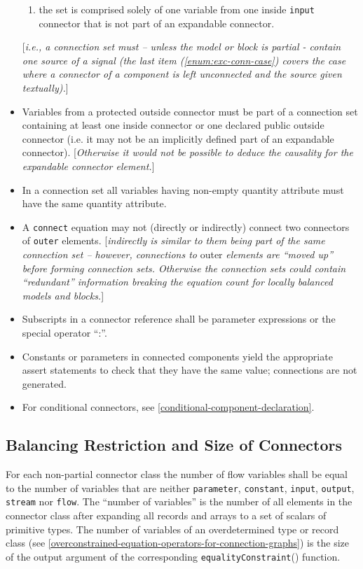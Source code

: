 \begin{itemize}
\begin{enumerate}
\item the  set is comprised solely of one variable from one inside \lstinline!input!
  connector that is not part of an expandable connector. \label{enum:exc-conn-case}
\end{enumerate}
{[}\emph{i.e., a connection set must -- unless the model or block is partial -
  contain one source of a signal (the last item (\autoref{enum:exc-conn-case}) covers the case
  where a connector of a component is left unconnected and the source
  given textually).}{]}
\item
  Variables from a protected outside connector must be part of a
  connection set containing at least one inside connector or one
  declared public outside connector (i.e. it may not be an implicitly
  defined part of an expandable connector). {[}\emph{Otherwise it would
  not be possible to deduce the causality for the expandable connector
  element.}{]}
\item
  In a connection set all variables having non-empty quantity attribute
  must have the same quantity attribute.
\item
  A \lstinline!connect! equation may not (directly or indirectly) connect two
  connectors of \lstinline!outer! elements. {[}\emph{indirectly is similar to them
  being part of the same connection set -- however, connections to}
  outer \emph{elements are ``moved up'' before forming connection sets.
  Otherwise the connection sets could contain ``redundant'' information
  breaking the equation count for locally balanced models and
  blocks.}{]}
\item
  Subscripts in a connector reference shall be parameter expressions or
  the special operator ``:''.
\item
  Constants or parameters in connected components yield the appropriate
  assert statements to check that they have the same value; connections
  are not generated.
\item
  For conditional connectors, see \autoref{conditional-component-declaration}.
\end{itemize}

\subsection{Balancing Restriction and Size of Connectors}

For each non-partial connector class the number of flow variables shall
be equal to the number of variables that are neither \lstinline!parameter!,
\lstinline!constant!, \lstinline!input!, \lstinline!output!, \lstinline!stream!
nor \lstinline!flow!. The ``number of variables'' is
the number of all elements in the connector class after expanding all
records and arrays to a set of scalars of primitive types. The number of
variables of an overdetermined type or record class (see \autoref{overconstrained-equation-operators-for-connection-graphs})
is the size of the output argument of the corresponding
\lstinline!equalityConstraint!() function.

